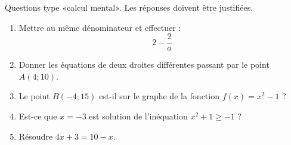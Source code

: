 
\begin{exercice}\label{exosmath-0693}

    Questions type «calcul mental». Les réponses doivent être justifiées.
    \begin{multicols}{2}
        \begin{enumerate}
            \item
                Mettre au même dénominateur et effectuer :
                \begin{equation}
                    2-\frac{ 2 }{ a }
                \end{equation}
            \item
                Donner les équations de deux droites différentes passant par le point \( A(4;10)\).
            \item
                Le point \( B(-4;15)\) est-il sur le graphe de la fonction \( f(x)=x^2-1\) ?
            \item
                Est-ce que \( x=-3\) est solution de l'inéquation \( x^2+1\geq -1\) ?
            \item
                Résoudre $4x+3=10-x$.
        \end{enumerate}
    \end{multicols}

\end{exercice}
